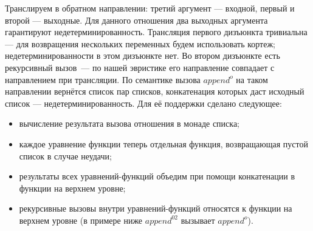 \documentclass[conference,american,russian]{IEEEtran}
\begin{document}


Транслируем в обратном направлении: третий аргумент --- входной, первый и второй --- выходные.
Для данного отношения два выходных аргумента гарантируют недетерминированность.
Трансляция первого дизъюнкта тривиальна --- для возвращения нескольких переменных будем использовать кортеж; недетерминированности в этом дизъюнкте нет.
Во втором дизъюнкте есть рекурсивный вызов~--- по нашей эвристике его направление совпадает с направлением при трансляции.
По семантике вызова $append^o$ на таком направлении вернётся список пар списков, конкатенация которых даст исходный список --- недетерминированность.
Для её поддержки сделано следующее:
\begin{itemize}
    \item вычисление результата вызова отношения в монаде списка;
    \item каждое уравнение функции теперь отдельная функция, возвращающая пустой список в случае неудачи;
    \item результаты всех уравнений-функций объедим при помощи конкатенации в функции на верхнем уровне;
    \item рекурсивные вызовы внутри уравнений-функций относятся к функции на верхнем уровне (в примере ниже $append^02$ вызывает $append^o$).
\end{itemize}
\end{document}
